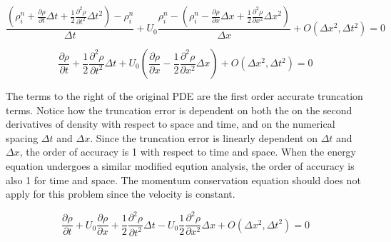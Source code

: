 \documentclass{mc2015}
\begin{document}
    \begin{equation}
    	\label{eq:MEA_start}
    	\frac{ \left( \rho_{i}^{n} + \frac{\partial \rho}{\partial t} \Delta t +
    	\frac{1}{2} \frac{\partial^2 \rho}{\partial t^2} \Delta t^2 \right)-\rho_{i}^{n} }{\Delta t} 
    	+ U_{0} \frac{\rho_{i}^{n} - \left( \rho_{i}^{n} -  \frac{\partial \rho}{\partial x} \Delta x + 
    	\frac{1}{2} \frac{\partial^2 \rho}{\partial x^2} \Delta x^2 \right)}{\Delta x} 
    	+ O(\Delta x^{2},\Delta t^{2}) 
    	= 0
    \end{equation}
    
    \begin{equation}
    	\label{eq:MEA_p0}
    	 \frac{\partial \rho}{\partial t}  + \frac{1}{2} \frac{\partial^2 \rho}{\partial t^2} \Delta t +
    	 U_{0} \left(   \frac{\partial \rho}{\partial x}  - \frac{1}{2} \frac{\partial^2 \rho}{\partial x^2} \Delta x \right) 
    	 + O(\Delta x^{2},\Delta t^{2}) 
    	 = 0
    \end{equation}
    
    The terms to the right of the original PDE are the first order accurate
    truncation terms. Notice how the truncation error is  dependent on both the
    on the second derivatives of density with respect to space and time, and on
    the numerical spacing $\Delta t$ and $\Delta x$. Since the truncation
    error is linearly dependent on $\Delta t$ and $\Delta x$, the order of
    accuracy is 1 with respect to time and space. When the energy equation
    undergoes a similar modified eqution analysis, the order of accuracy is also
    1 for time and space. The momentum conservation equation should does not
    apply for this problem since the velocity is constant.
    
    \begin{equation}
    	\label{eq:MEA_p1}
    	 \frac{\partial \rho}{\partial t}  +  U_{0} \frac{\partial \rho}{\partial x} + 
    	 \frac{1}{2} \frac{\partial^2 \rho}{\partial t^2} \Delta t -
    	   U_{0}  \frac{1}{2} \frac{\partial^2 \rho}{\partial x^2} \Delta x  
    	   + O(\Delta x^{2},\Delta t^{2}) = 0 
    \end{equation} 
    
\end{document}
